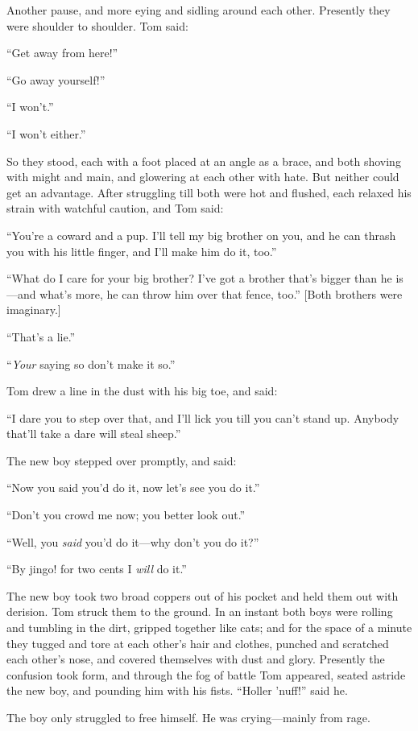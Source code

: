 \documentclass{book}
\begin{document}
Another pause, and more eying and sidling around each other. Presently they were shoulder to shoulder. Tom said:

“Get away from here!”

“Go away yourself!”

“I won’t.”

“I won’t either.”

So they stood, each with a foot placed at an angle as a brace, and both shoving with might and main, and glowering at each other with hate. But neither could get an advantage. After struggling till both were hot and flushed, each relaxed his strain with watchful caution, and Tom said:

“You’re a coward and a pup. I’ll tell my big brother on you, and he can thrash you with his little finger, and I’ll make him do it, too.”

“What do I care for your big brother? I’ve got a brother that’s bigger than he is—and what’s more, he can throw him over that fence, too.” [Both brothers were imaginary.]

“That’s a lie.”

“\emph{Your} saying so don’t make it so.”

Tom drew a line in the dust with his big toe, and said:

“I dare you to step over that, and I’ll lick you till you can’t stand up. Anybody that’ll take a dare will steal sheep.”

The new boy stepped over promptly, and said:

“Now you said you’d do it, now let’s see you do it.”

“Don’t you crowd me now; you better look out.”

“Well, you \emph{said} you’d do it—why don’t you do it?”

“By jingo! for two cents I \emph{will} do it.”

The new boy took two broad coppers out of his pocket and held them out with derision. Tom struck them to the ground. In an instant both boys were rolling and tumbling in the dirt, gripped together like cats; and for the space of a minute they tugged and tore at each other’s hair and clothes, punched and scratched each other’s nose, and covered themselves with dust and glory. Presently the confusion took form, and through the fog of battle Tom appeared, seated astride the new boy, and pounding him with his fists. “Holler ’nuff!” said he.

The boy only struggled to free himself. He was crying—mainly from rage.
\end{document}
